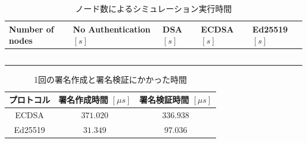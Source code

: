 \setlength{\tabcolsep}{4pt}
\begin{longtable}{
    >{\raggedright\arraybackslash}p{3cm}
    >{\raggedright\arraybackslash}p{3.7cm}
    >{\raggedright\arraybackslash}p{2.5cm}
    >{\raggedright\arraybackslash}p{2.5cm}
    >{\raggedright\arraybackslash}p{2.5cm}
  }
  \caption{ノード数によるシミュレーション実行時間}
  \label{tab:exp3_simtime} \\
  \endfirsthead
  \hline
  Number of nodes & No Authentication $[s]$ & DSA $[s]$ & ECDSA $[s]$ & Ed25519 $[s]$ \\ \hline \hline
  \multicolumn{1}{c}{$37$} &
  \multicolumn{1}{c}{$14.1802$} &
  \multicolumn{1}{l}{$69.9882$} &
  \multicolumn{1}{l}{$55.0108$} &
  \multicolumn{1}{l}{$24.4069$} \\
  \multicolumn{1}{c}{$74$} &
  \multicolumn{1}{c}{$50.5984$} &
  \multicolumn{1}{l}{$267.433$} &
  \multicolumn{1}{l}{$194.408$} &
  \multicolumn{1}{l}{$89.2728$} \\
  \multicolumn{1}{c}{$112$} &
  \multicolumn{1}{c}{$110.405$} &
  \multicolumn{1}{l}{$625.504$} &
  \multicolumn{1}{l}{$436.926$} &
  \multicolumn{1}{l}{$200.901$} \\
  \multicolumn{1}{c}{$148$} &
  \multicolumn{1}{c}{$196.971$} &
  \multicolumn{1}{l}{$1172.57$} &
  \multicolumn{1}{l}{$910.373$} &
  \multicolumn{1}{l}{$431.346$} \\
  \multicolumn{1}{c}{$185$} &
  \multicolumn{1}{c}{$345.059$} &
  \multicolumn{1}{l}{$1908.7$} &
  \multicolumn{1}{l}{$1324.55$} &
  \multicolumn{1}{l}{$635.155$} \\ \hline

\end{longtable}

\begin{longtable}{ccc}
  \caption{1回の署名作成と署名検証にかかった時間}
  \label{tab:exp3_sigtime} \\
  \endfirsthead
  \hline
  \multicolumn{1}{c}{プロトコル} &
  \multicolumn{1}{c}{署名作成時間 $[\mu s]$} &
  \multicolumn{1}{c}{署名検証時間 $[\mu s]$} \\ \hline \hline
  ECDSA & $371.020$ & $336.938$ \\
  Ed25519 & $31.349$ & $97.036$ \\ \hline
\end{longtable}

